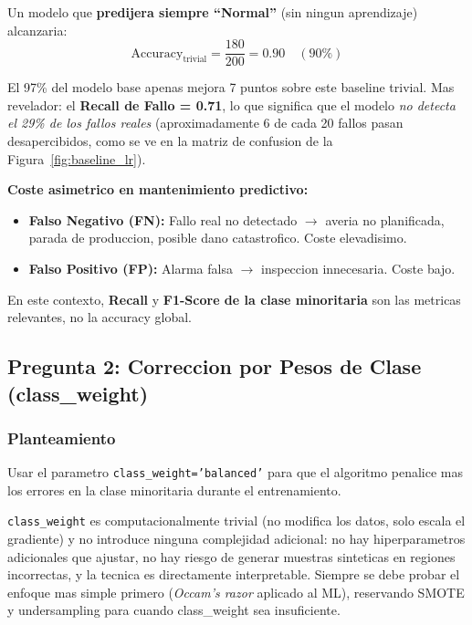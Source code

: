 \documentclass[12pt,a4paper]{article}
\begin{document}
\begin{tcolorbox}[warnbox, title={Por que el 97\% de accuracy es enganoso?}]
  Un modelo que \textbf{predijera siempre ``Normal''} (sin ningun aprendizaje) alcanzaria:
  \begin{equation}
    \text{Accuracy}_{\text{trivial}} = \frac{180}{200} = 0.90 \quad (90\%)
    \label{eq:trivial_accuracy}
  \end{equation}

  El 97\% del modelo base apenas mejora 7 puntos sobre este baseline trivial. Mas revelador: el
  \textbf{Recall de Fallo = 0.71}, lo que significa que el modelo \textit{no detecta el 29\%
  de los fallos reales} (aproximadamente 6 de cada 20 fallos pasan desapercibidos, como se
  ve en la matriz de confusion de la Figura~\ref{fig:baseline_lr}).

  \medskip
  \textbf{Coste asimetrico en mantenimiento predictivo:}
  \begin{itemize}
    \item \textbf{Falso Negativo (FN):} Fallo real no detectado $\to$ averia no planificada,
      parada de produccion, posible dano catastrofico. Coste elevadisimo.
    \item \textbf{Falso Positivo (FP):} Alarma falsa $\to$ inspeccion innecesaria. Coste bajo.
  \end{itemize}
  En este contexto, \textbf{Recall} y \textbf{F1-Score de la clase minoritaria} son las metricas
  relevantes, no la accuracy global.
\end{tcolorbox}

\subsection{Pregunta 2: Correccion por Pesos de Clase (class\_weight)}

\subsubsection*{Planteamiento}
Usar el parametro \texttt{class\_weight='balanced'} para que el algoritmo penalice mas los
errores en la clase minoritaria durante el entrenamiento.

\begin{tcolorbox}[porquebox, title={Por que class\_weight es la primera estrategia a probar?}]
\texttt{class\_weight} es computacionalmente trivial (no modifica los datos, solo escala el
gradiente) y no introduce ninguna complejidad adicional: no hay hiperparametros adicionales que
ajustar, no hay riesgo de generar muestras sinteticas en regiones incorrectas, y la tecnica es
directamente interpretable. Siempre se debe probar el enfoque mas simple primero (\textit{Occam's
razor} aplicado al ML), reservando SMOTE y undersampling para cuando class\_weight sea insuficiente.
\end{tcolorbox}
\end{document}

